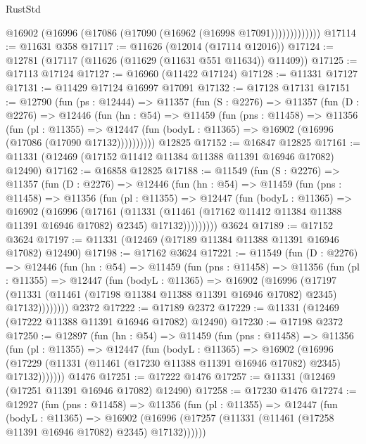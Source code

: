 \begin{lexlean}{RustStd}
\begin{coremodule}
                  @16902 (@16996 (@17086 (@17090 (@16962 (@16998 @17091)))))))))))))
@17114 := @11631 @358
@17117 := @11626 (@12014 (@17114 @12016))
@17124 := @12781 (@17117 (@11626 (@11629 (@11631 @551 @11634)) @11409))
@17125 := @17113 @17124
@17127 := @16960 (@11422 @17124)
@17128 := @11331 @17127
@17131 := @11429 @17124 @16997 @17091
@17132 := @17128 @17131
@17151 := @12790
    (fun (ps : @12444) =>
    @11357
      (fun (S : @2276) =>
      @11357
        (fun (D : @2276) =>
        @12446
          (fun (hn : @54) =>
          @11459
            (fun (pns : @11458) =>
            @11356
              (fun (pl : @11355) =>
              @12447 (fun (bodyL : @11365) => @16902 (@16996 (@17086 (@17090 @17132))))))))))
    @12825
@17152 := @16847 @12825
@17161 := @11331 (@12469 (@17152 @11412 @11384 @11388 @11391 @16946 @17082) @12490)
@17162 := @16858 @12825
@17188 := @11549
    (fun (S : @2276) =>
    @11357
      (fun (D : @2276) =>
      @12446
        (fun (hn : @54) =>
        @11459
          (fun (pns : @11458) =>
          @11356
            (fun (pl : @11355) =>
            @12447
              (fun (bodyL : @11365) =>
              @16902
                (@16996
                  (@17161
                    (@11331
                      (@11461 (@17162 @11412 @11384 @11388 @11391 @16946 @17082) @2345)
                      @17132)))))))))
    @3624
@17189 := @17152 @3624
@17197 := @11331 (@12469 (@17189 @11384 @11388 @11391 @16946 @17082) @12490)
@17198 := @17162 @3624
@17221 := @11549
    (fun (D : @2276) =>
    @12446
      (fun (hn : @54) =>
      @11459
        (fun (pns : @11458) =>
        @11356
          (fun (pl : @11355) =>
          @12447
            (fun (bodyL : @11365) =>
            @16902
              (@16996
                (@17197
                  (@11331 (@11461 (@17198 @11384 @11388 @11391 @16946 @17082) @2345) @17132))))))))
    @2372
@17222 := @17189 @2372
@17229 := @11331 (@12469 (@17222 @11388 @11391 @16946 @17082) @12490)
@17230 := @17198 @2372
@17250 := @12897
    (fun (hn : @54) =>
    @11459
      (fun (pns : @11458) =>
      @11356
        (fun (pl : @11355) =>
        @12447
          (fun (bodyL : @11365) =>
          @16902
            (@16996
              (@17229 (@11331 (@11461 (@17230 @11388 @11391 @16946 @17082) @2345) @17132)))))))
    @1476
@17251 := @17222 @1476
@17257 := @11331 (@12469 (@17251 @11391 @16946 @17082) @12490)
@17258 := @17230 @1476
@17274 := @12927
    (fun (pns : @11458) =>
    @11356
      (fun (pl : @11355) =>
      @12447
        (fun (bodyL : @11365) =>
        @16902 (@16996 (@17257 (@11331 (@11461 (@17258 @11391 @16946 @17082) @2345) @17132))))))

\end{coremodule}
\end{lexlean}
